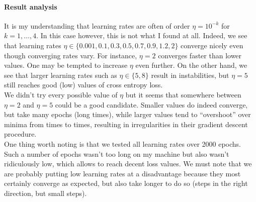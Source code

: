 \documentclass[12pt]{article}
\begin{document}
\paragraph{Result analysis}
It is my understanding that learning rates are often of order $\eta = 10^{-k}$ for $k = 1, \ldots, 4$. In this case however, this is not what I found at all. Indeed, we see that learning rates $\eta \in \{ 0.001, 0.1, 0.3, 0.5, 0.7, 0.9, 1.2, 2 \}$ converge nicely even though converging rates vary. For instance, $\eta = 2$ converges faster than lower values. One may be tempted to increase $\eta$ even further. On the other hand, we see that larger learning rates such as $\eta \in \{ 5, 8 \}$ result in instabilities, but $\eta = 5$ still reaches good (low) values of cross entropy loss. \\
We didn't try every possible value of $\eta$ but it seems that somewhere between $\eta = 2$ and $\eta = 5$ could be a good candidate. Smaller values do indeed converge, but take many epochs (\ie long times), while larger values tend to ``overshoot'' over minima from times to times, resulting in irregularities in their gradient descent procedure. \\
One thing worth noting is that we tested all learning rates over 2000 epochs. Such a number of epochs wasn't too long on my machine but also wasn't ridiculously low, which allows to reach decent loss values. We must note that we are probably putting low learning rates at a disadvantage because they most certainly converge as expected, but also take longer to do so (steps in the right direction, but small steps).
\end{document}

